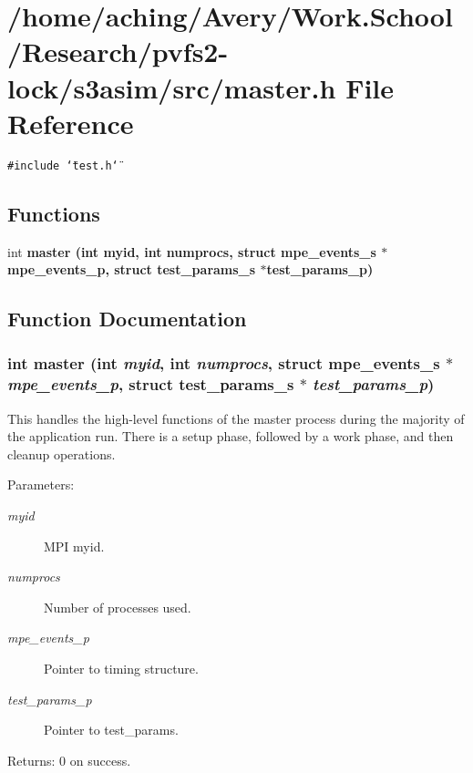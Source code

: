 \section{/home/aching/Avery/Work.School/Research/pvfs2-lock/s3asim/src/master.h File Reference}
\label{master_8h}
{\tt \#include \char`\"{}test.h\char`\"{}}\par
\subsection*{Functions}
\begin{CompactItemize}
\item 
int \bf{master} (int myid, int numprocs, struct \bf{mpe\_\-events\_\-s} $\ast$mpe\_\-events\_\-p, struct \bf{test\_\-params\_\-s} $\ast$test\_\-params\_\-p)
\end{CompactItemize}


\subsection{Function Documentation}
\subsubsection{\setlength{\rightskip}{0pt plus 5cm}int master (int {\em myid}, int {\em numprocs}, struct \bf{mpe\_\-events\_\-s} $\ast$ {\em mpe\_\-events\_\-p}, struct \bf{test\_\-params\_\-s} $\ast$ {\em test\_\-params\_\-p})}\label{master_8h_c390bba10a532460b92d0cd37778087a}


This handles the high-level functions of the master process during the majority of the application run. There is a setup phase, followed by a work phase, and then cleanup operations.

\begin{Desc}
\item[Parameters:]
\begin{description}
\item[{\em myid}]MPI myid. \item[{\em numprocs}]Number of processes used. \item[{\em mpe\_\-events\_\-p}]Pointer to timing structure. \item[{\em test\_\-params\_\-p}]Pointer to test\_\-params. \end{description}
\end{Desc}
\begin{Desc}
\item[Returns:]0 on success. \end{Desc}
